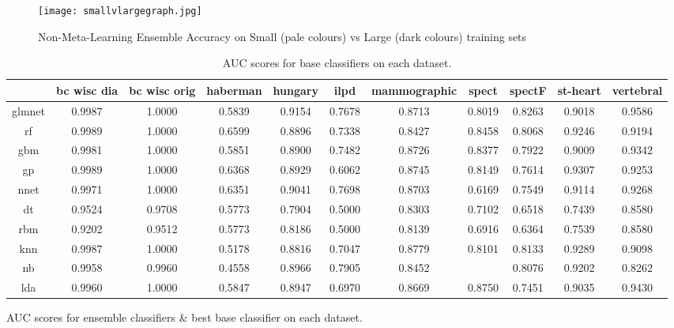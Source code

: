 \documentclass{bioinfo}
\begin{document}
\begin{figure}[p]
\texttt{[image: smallvlargegraph.jpg]}
\caption{Non-Meta-Learning Ensemble Accuracy on Small (pale colours) vs Large (dark colours) training sets}
\label{fig:03}
\end{figure}

\clearpage


\begin{table}
\centering
\begin{tabular}
    {|c|c|c|c|c|c|c|c|c|c|c|}
    \hline
     & bc wisc dia & bc wisc orig & haberman & hungary & ilpd & mammographic & spect & spectF & st-heart & vertebral\\ \hline
    glmnet & 0.9987 & 1.0000 & 0.5839 & 0.9154 & 0.7678 & 0.8713 & 0.8019 & 0.8263 & 0.9018 & 0.9586\\ \hline
    rf & 0.9989 & 1.0000 & 0.6599 & 0.8896 & 0.7338 & 0.8427 & 0.8458 & 0.8068 & 0.9246 & 0.9194\\ \hline
    gbm & 0.9981 & 1.0000 & 0.5851 & 0.8900 & 0.7482 & 0.8726 & 0.8377 & 0.7922 & 0.9009 & 0.9342\\ \hline
    gp & 0.9989 & 1.0000 & 0.6368 & 0.8929 & 0.6062 & 0.8745 & 0.8149 & 0.7614 & 0.9307 & 0.9253\\ \hline
    nnet & 0.9971 & 1.0000 & 0.6351 & 0.9041 & 0.7698 & 0.8703 & 0.6169 & 0.7549 & 0.9114 & 0.9268\\ \hline
    dt & 0.9524 & 0.9708 & 0.5773 & 0.7904 & 0.5000 & 0.8303 & 0.7102 & 0.6518 & 0.7439 & 0.8580\\ \hline
    rbm & 0.9202 & 0.9512 & 0.5773 & 0.8186 & 0.5000 & 0.8139 & 0.6916 & 0.6364 & 0.7539 & 0.8580\\ \hline
    knn & 0.9987 & 1.0000 & 0.5178 & 0.8816 & 0.7047 & 0.8779 & 0.8101 & 0.8133 & 0.9289 & 0.9098\\ \hline
    nb & 0.9958 & 0.9960 & 0.4558 & 0.8966 & 0.7905 & 0.8452 & \footnotemark & 0.8076 & 0.9202 & 0.8262\\ \hline
    lda & 0.9960 & 1.0000 & 0.5847 & 0.8947 & 0.6970 & 0.8669 & 0.8750 & 0.7451 & 0.9035 & 0.9430\\ \hline
\end{tabular}
\caption{AUC scores for base classifiers on each dataset.}
\label{fig:04}
\end{table}



\clearpage

\begin{table}[t]
\caption{AUC scores for ensemble classifiers \& best base classifier on each dataset.}
\label{fig:05}
\end{table}
\end{document}

